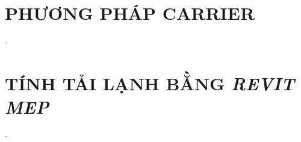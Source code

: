 \begin{minipage}{\textwidth}
	\begin{minipage}[b]{0.45\linewidth}
		
	\end{minipage}
	\hfill
	\begin{minipage}[b]{0.45\linewidth}
		
	\end{minipage}
\end{minipage}

\section{PHƯƠNG PHÁP CARRIER}
-

\section{TÍNH TẢI LẠNH BẰNG \emph{REVIT MEP}}
- 
